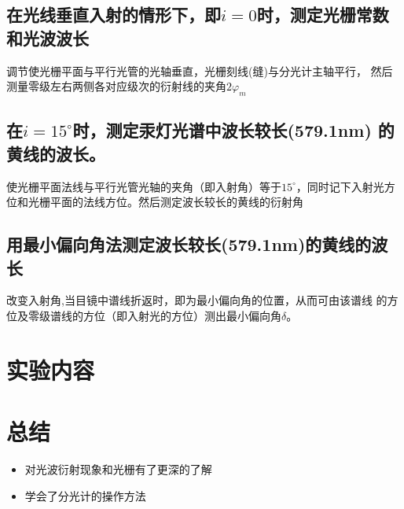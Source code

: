 \documentclass{ctexart}
\begin{document}
    \subsection{在光线垂直入射的情形下，即$i=0$时，测定光栅常数和光波波长}
    调节使光栅平面与平行光管的光轴垂直，光栅刻线(缝)与分光计主轴平行，
    然后测量零级左右两侧各对应级次的衍射线的夹角$2\varphi _m$
    \subsection{在$i=15^{\circ}$时，测定汞灯光谱中波长较长(579.1nm)
    的黄线的波长。}
    使光栅平面法线与平行光管光轴的夹角（即入射角）等于$15^{\circ}$，同时记下入射光方
位和光栅平面的法线方位。然后测定波长较长的黄线的衍射角
    \subsection{用最小偏向角法测定波长较长(579.1nm)的黄线的波长}
      改变入射角,当目镜中谱线折返时，即为最小偏向角的位置，从而可由该谱线
      的方位及零级谱线的方位（即入射光的方位）测出最小偏向角$\delta$。

\section{实验内容}


\section{总结}
\begin{itemize}
  \item 对光波衍射现象和光栅有了更深的了解
  \item 学会了分光计的操作方法
\end{itemize}
\end{document}

